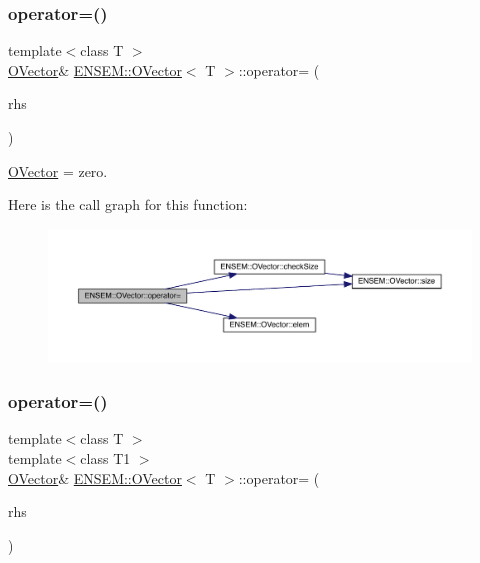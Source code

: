 \subsubsection{\texorpdfstring{operator=()}{operator=()}\hspace{0.1cm}{\footnotesize\ttfamily [3/12]}}
{\footnotesize\ttfamily template$<$class T $>$ \\
\mbox{\hyperlink{classENSEM_1_1OVector}{O\+Vector}}\& \mbox{\hyperlink{classENSEM_1_1OVector}{E\+N\+S\+E\+M\+::\+O\+Vector}}$<$ T $>$\+::operator= (\begin{DoxyParamCaption}\item[{const \mbox{\hyperlink{structENSEM_1_1Zero}{Zero}} \&}]{rhs }\end{DoxyParamCaption})\hspace{0.3cm}{\ttfamily [inline]}}



\mbox{\hyperlink{classENSEM_1_1OVector}{O\+Vector}} = zero. 

Here is the call graph for this function\+:
\nopagebreak
\begin{figure}[H]
\begin{center}
\leavevmode
\includegraphics[width=350pt]{d0/d8d/classENSEM_1_1OVector_a54123bea722ddb2b3eaea0c948735b13_cgraph}
\end{center}
\end{figure}
\mbox{\label{classENSEM_1_1OVector_a31b08dda73879d2a39c4a0bec90bc401}} 
\subsubsection{\texorpdfstring{operator=()}{operator=()}\hspace{0.1cm}{\footnotesize\ttfamily [4/12]}}
{\footnotesize\ttfamily template$<$class T $>$ \\
template$<$class T1 $>$ \\
\mbox{\hyperlink{classENSEM_1_1OVector}{O\+Vector}}\& \mbox{\hyperlink{classENSEM_1_1OVector}{E\+N\+S\+E\+M\+::\+O\+Vector}}$<$ T $>$\+::operator= (\begin{DoxyParamCaption}\item[{const \mbox{\hyperlink{classENSEM_1_1OScalar}{O\+Scalar}}$<$ T1 $>$ \&}]{rhs }\end{DoxyParamCaption})\hspace{0.3cm}{\ttfamily [inline]}}



